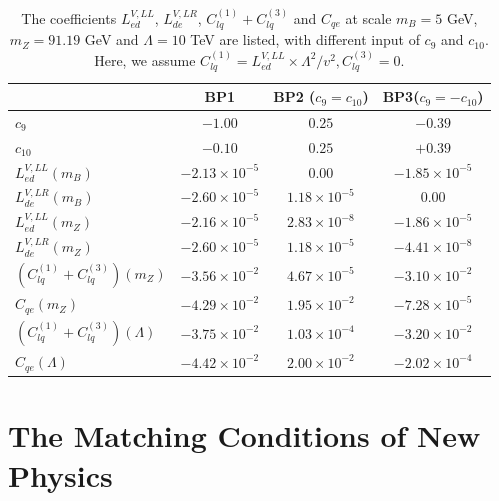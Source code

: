 \documentclass[a4paper,11pt]{article}
\begin{document}
\begin{center}
\begin{table}
  \begin{center}
  \begin{tabular}{|l|c|c|c|}
  \hline
  & BP1 & BP2 ($c_9=c_{10}$)& BP3($c_9=-c_{10}$) \\
  \hline
$c_9$  &      $-1.00$        &     $0.25$         &       $-0.39$         \\
$c_{10}$  &      $-0.10$     &     $0.25$       &       $+0.39$       \\
  \hline  
  $L^{V,LL}_{ed}(m_B)$                   &   $-2.13\times 10^{-5}$   &  $0.00$                &  $-1.85\times 10^{-5}$    \\
  $L^{V,LR}_{de}(m_B)$                   &   $-2.60\times 10^{-5}$   &  $1.18\times 10^{-5}$  &  $0.00$                   \\ 
\hline
  $L^{V,LL}_{ed}(m_Z)$                   &   $-2.16\times 10^{-5}$   &  $2.83\times 10^{-8}$  &  $-1.86\times 10^{-5}$       \\
  $L^{V,LR}_{de}(m_Z)$                   &   $-2.60\times 10^{-5}$   &  $1.18\times 10^{-5}$  &  $-4.41\times 10^{-8}$    
\\
  \hline
  $(C^{(1)}_{lq}+C^{(3)}_{lq})(m_Z)$     &   $-3.56\times 10^{-2}$   &  $4.67\times 10^{-5}$  &  $-3.10\times 10^{-2}$    \\
  $C_{qe}(m_Z)$                          &   $-4.29\times 10^{-2}$   &  $1.95\times 10^{-2}$  &  $-7.28\times 10^{-5}$    \\
  \hline
  $(C^{(1)}_{lq}+C^{(3)}_{lq})(\Lambda)$ &   $-3.75\times 10^{-2}$   &  $1.03\times 10^{-4}$  &  $-3.20\times 10^{-2}$    \\                    
  $C_{qe}(\Lambda)$                      &   $-4.42\times 10^{-2}$   &  $2.00\times 10^{-2}$  &  $-2.02\times 10^{-4}$   \\
  \hline
  \end{tabular}
  \end{center}
  \caption{The coefficients $L^{V,LL}_{ed}$, $L^{V,LR}_{de}$, $C^{(1)}_{lq}+C^{(3)}_{lq}$ and $C_{qe}$ at scale $m_B=5$ GeV, $m_Z=91.19$ GeV and $\Lambda=10$ TeV are listed, with different input of $c_9$ and $c_{10}$. Here, we assume $C^{(1)}_{lq}=L^{V,LL}_{ed}\times \Lambda^2/v^2, C^{(3)}_{lq}=0$. \label{table:LVLLed}}
\end{table}
\end{center}

\section{The Matching Conditions of New Physics}
\label{Sec:NP}
\end{document}
